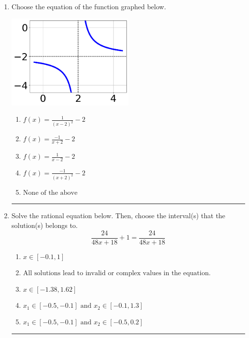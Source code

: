 \documentclass[14pt]{extbook}
\newcommand{\litem}[1]{\item#1\hspace*{-1cm}\rule{\textwidth}{0.4pt}}
\begin{document}
\begin{enumerate}
{\begin{enumerate}[label=\Alph*.]
\end{enumerate} }
\litem{
Choose the equation of the function graphed below.
\begin{center}
    \includegraphics[width=0.5\textwidth]{../Figures/rationalGraphToEquationCopyA.png}
\end{center}
\begin{enumerate}[label=\Alph*.]
\item \( f(x) = \frac{1}{(x - 2)^2} - 2 \)
\item \( f(x) = \frac{-1}{x + 2} - 2 \)
\item \( f(x) = \frac{1}{x - 2} - 2 \)
\item \( f(x) = \frac{-1}{(x + 2)^2} - 2 \)
\item \( \text{None of the above} \)

\end{enumerate} }
\litem{
Solve the rational equation below. Then, choose the interval(s) that the solution(s) belongs to.\[ \frac{24}{48x + 18} + 1 = \frac{24}{48x + 18} \]\begin{enumerate}[label=\Alph*.]
\item \( x \in [-0.1,1] \)
\item \( \text{All solutions lead to invalid or complex values in the equation.} \)
\item \( x \in [-1.38,1.62] \)
\item \( x_1 \in [-0.5, -0.1] \text{ and } x_2 \in [-0.1,1.3] \)
\item \( x_1 \in [-0.5, -0.1] \text{ and } x_2 \in [-0.5,0.2] \)


\end{enumerate}}
\end{enumerate}
\end{document}
